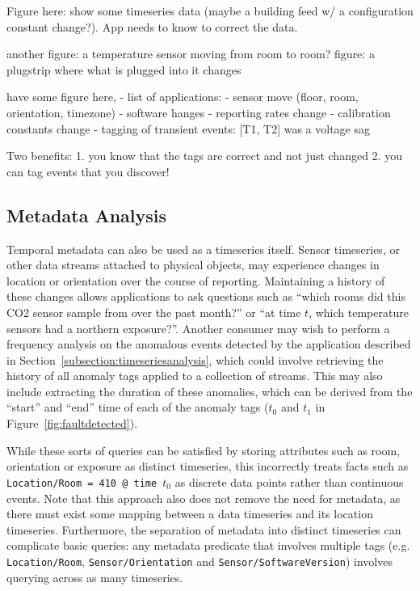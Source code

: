 Figure here: show some timeseries data (maybe a building feed w/ a configuration
constant change?). App needs to know to correct the data.

another figure: a temperature sensor moving from room to room?
figure: a plugstrip where what is plugged into it changes
\fi

have some figure here,
- list of applications:
    - sensor move (floor, room, orientation, timezone)
    - software hanges
    - reporting rates change
    - calibration constants change
    - tagging of transient events: [T1, T2] was a voltage sag

Two benefits:
1. you know that the tags are correct and not just changed
2. you can tag events that you discover!
\fi

\subsection{Metadata Analysis}

Temporal metadata can also be used as a timeseries itself. Sensor timeseries,
or other data streams attached to physical objects, may experience changes in
location or orientation over the course of reporting. Maintaining a history of
these changes allows applications to ask questions such as ``which rooms did
this CO2 sensor sample from over the past month?'' or ``at time $t$, which
temperature sensors had a northern exposure?''. Another consumer may wish to
perform a frequency analysis on the anomalous events detected by the
application described in Section~\ref{subsection:timeseriesanalysis}, which
could involve retrieving the history of all anomaly tags applied to a
collection of streams. This may also include extracting the duration of these
anomalies, which can be derived from the ``start'' and ``end'' time of each of
the anomaly tags ($t_0$ and $t_1$ in Figure~\ref{fig:faultdetected}).

While these sorts of queries can be satisfied by storing attributes such as
room, orientation or exposure as distinct timeseries, this incorrectly treats
facts such as \texttt{Location/Room = 410 @ time $t_0$} as discrete data points
rather than continuous events. Note that this approach also does not remove the
need for metadata, as there must exist some mapping between a data timeseries
and its location timeseries.  Furthermore, the separation of metadata into
distinct timeseries can complicate basic queries: any metadata predicate that
involves multiple tags (e.g. \texttt{Location/Room},
\texttt{Sensor/Orientation} and \texttt{Sensor/SoftwareVersion}) involves
querying across as many timeseries.

